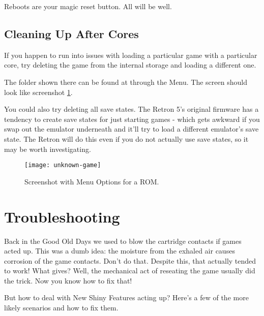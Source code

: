 \documentclass[english]{retronlabo-manual}
\begin{document}
Reboots are your magic reset button. All will be well.

\subsection{Cleaning Up After Cores}

If you happen to run into issues with loading a particular game with a particular core, try deleting the game from the internal storage and loading a different one.

The folder shown there can be found at  through the Menu. The screen should look like screenshot \ref{fig:unknown-game}.


You could also try deleting all save states. The Retron 5's original firmware has a tendency to create save states for just starting games - which gets awkward if you swap out the emulator underneath and it'll try to load a different emulator's save state. The Retron will do this even if you do not actually use save states, so it may be worth investigating.

\begin{figure}[ht]
\caption{Screenshot with Menu Options for a ROM.}
\texttt{[image: unknown-game]}
\label{fig:unknown-game}
\end{figure}

\section{Troubleshooting}

Back in the Good Old Days we used to blow the cartridge contacts if games acted up. This was a dumb idea: the moisture from the exhaled air causes corrosion of the game contacts. Don't do that. Despite this, that actually tended to work! What gives? Well, the mechanical act of reseating the game usually did the trick. Now you know how to fix that!

But how to deal with New Shiny Features acting up? Here's a few of the more likely scenarios and how to fix them.
\end{document}
